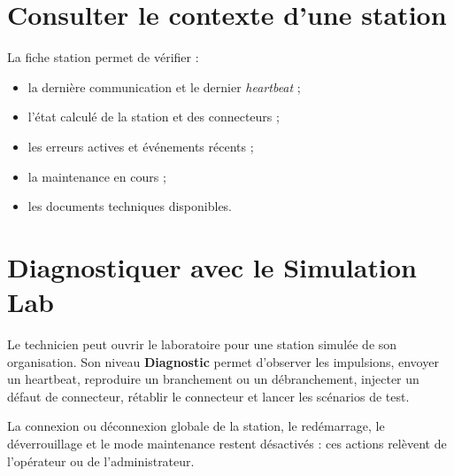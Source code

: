 
\section{Consulter le contexte d'une station}


La fiche station permet de vérifier :

\begin{itemize}[leftmargin=1.6em]
  \item la dernière communication et le dernier \emph{heartbeat} ;
  \item l'état calculé de la station et des connecteurs ;
  \item les erreurs actives et événements récents ;
  \item la maintenance en cours ;
  \item les documents techniques disponibles.
\end{itemize}


\section{Diagnostiquer avec le Simulation Lab}

Le technicien peut ouvrir le laboratoire pour une station simulée de son
organisation. Son niveau \textbf{Diagnostic} permet d'observer les impulsions,
envoyer un heartbeat, reproduire un branchement ou un débranchement, injecter un
défaut de connecteur, rétablir le connecteur et lancer les scénarios de test.

La connexion ou déconnexion globale de la station, le redémarrage, le
déverrouillage et le mode maintenance restent désactivés : ces actions relèvent
de l'opérateur ou de l'administrateur.

